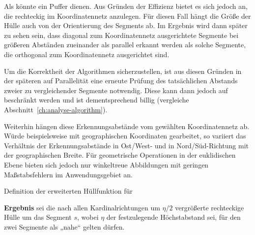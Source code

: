 \documentclass[../main/thesis.tex]{subfiles}
\begin{document}

Als  könnte ein Puffer dienen.
Aus Gründen der Effizienz bietet es sich jedoch an, die  rechteckig im Koordinatennetz anzulegen.
Für diesen Fall hängt die Größe der Hülle auch von der Orientierung des Segments ab.
Im Ergebnis wird dann später zu sehen sein, dass diagonal zum Koordinatennetz ausgerichtete Segmente bei größeren Abständen zueinander als parallel erkannt werden als solche Segmente, die orthogonal zum Koordinatennetz ausgerichtet sind.

Um die Korrektheit der Algorithmen sicherzustellen, ist aus diesen Gründen in der späteren  auf Parallelität eine erneute Prüfung des tatsächlichen Abstands zweier zu vergleichender Segmente notwendig.
Diese kann dann jedoch auf  beschränkt werden und ist dementsprechend billig (vergleiche Abschnitt~\ref{ch:analyse-algorithm}).

Weiterhin hängen diese Erkennungsabstände vom gewählten Koordinatennetz ab.
Würde beispielsweise mit geographischen Koordinaten gearbeitet, so variiert das Verhältnis der Erkennungsabstände in Ost/West- und in Nord/Süd-Richtung mit der geographischen Breite.
Für geometrische Operationen in der euklidischen Ebene bieten sich jedoch nur winkeltreue Abbildungen mit geringen Maßstabsfehlern im Anwendungsgebiet an. 


\begin{algorithmhere}{Definition der erweiterten Hüllfunktion für }
\label{alg:Huelle}
\begin{algorithmic}
	\State \textbf{Ergebnis} sei die nach allen Kardinalrichtungen um $\eta/2$ vergrößerte rechteckige Hülle um das Segment $s$, wobei $\eta$ der festzulegende Höchstabstand sei, für den zwei Segmente als „nahe“ gelten dürfen.
\EndFunction
\end{algorithmic}
\end{algorithmhere}
\end{document}
